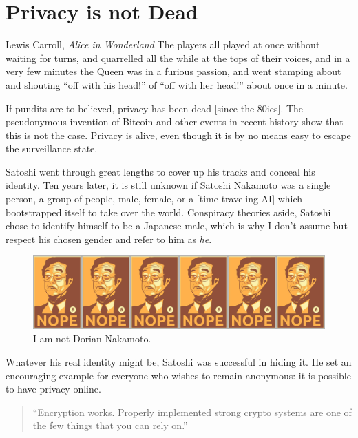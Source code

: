 \chapter{ Privacy is not Dead}
\label{les:19}

\begin{chapquote}{Lewis Carroll, \textit{Alice in Wonderland}}
The players all played at once without waiting for turns, and quarrelled all
the while at the tops of their voices, and in a very few minutes the Queen was
in a furious passion, and went stamping about and shouting ``off with his
head!'' of ``off with her head!'' about once in a minute.
\end{chapquote}

If pundits are to believed, privacy has been dead [since the 80ies]. The
pseudonymous invention of Bitcoin and other events in recent history
show that this is not the case. Privacy is alive, even though it is by
no means easy to escape the surveillance state.

Satoshi went through great lengths to cover up his tracks and conceal
his identity. Ten years later, it is still unknown if Satoshi Nakamoto
was a single person, a group of people, male, female, or a
[time-traveling AI] which bootstrapped itself to take over the world.
Conspiracy theories aside, Satoshi chose to identify himself to be a
Japanese male, which is why I don't assume but respect his chosen gender
and refer to him as \textit{he}.

\begin{figure}
  \includegraphics{assets/images/nope.png}
  \caption{I am not Dorian Nakamoto.}
  \label{fig:nope}
\end{figure}

Whatever his real identity might be, Satoshi was successful in hiding
it. He set an encouraging example for everyone who wishes to remain
anonymous: it is possible to have privacy online.

\begin{quotation}
``Encryption works. Properly implemented strong crypto systems are one
of the few things that you can rely on.''
\end{quotation}

